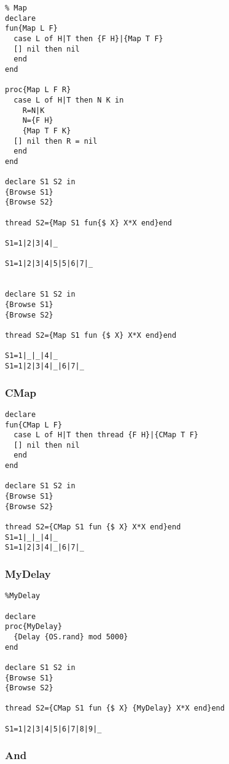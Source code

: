 \documentclass[]{article}
\begin{document}
\begin{verbatim}
% Map
declare
fun{Map L F}
  case L of H|T then {F H}|{Map T F}
  [] nil then nil
  end
end

proc{Map L F R}
  case L of H|T then N K in
    R=N|K
    N={F H}
    {Map T F K}
  [] nil then R = nil
  end
end

declare S1 S2 in
{Browse S1}
{Browse S2}

thread S2={Map S1 fun{$ X} X*X end}end

S1=1|2|3|4|_

S1=1|2|3|4|5|5|6|7|_


declare S1 S2 in
{Browse S1}
{Browse S2}

thread S2={Map S1 fun {$ X} X*X end}end

S1=1|_|_|4|_
S1=1|2|3|4|_|6|7|_
\end{verbatim}

\hypertarget{cmap}{%
\subsubsection{CMap}\label{cmap}}

\begin{verbatim}
declare
fun{CMap L F}
  case L of H|T then thread {F H}|{CMap T F}
  [] nil then nil
  end
end

declare S1 S2 in
{Browse S1}
{Browse S2}

thread S2={CMap S1 fun {$ X} X*X end}end
S1=1|_|_|4|_
S1=1|2|3|4|_|6|7|_
\end{verbatim}

\hypertarget{mydelay}{%
\subsubsection{MyDelay}\label{mydelay}}

\begin{verbatim}
%MyDelay

declare
proc{MyDelay}
  {Delay {OS.rand} mod 5000}
end

declare S1 S2 in
{Browse S1}
{Browse S2}

thread S2={CMap S1 fun {$ X} {MyDelay} X*X end}end

S1=1|2|3|4|5|6|7|8|9|_
\end{verbatim}

\hypertarget{and}{%
\subsubsection{And}\label{and}}
\end{document}
